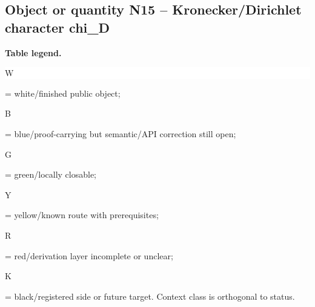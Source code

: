 \subsection*{Object or quantity N15 -- Kronecker/\allowbreak{}Dirichlet character chi\_D}
\hypertarget{objproof:N15}{}
\par\smallskip\noindent\begin{minipage}{0.99\linewidth}\footnotesize\raggedright\textbf{Table legend.} \colorbox{white}{\strut W} = white/finished public object; \colorbox{cyan!20}{\strut B} = blue/proof-carrying but semantic/API correction still open; \colorbox{green!18}{\strut G} = green/locally closable; \colorbox{yellow!25}{\strut Y} = yellow/known route with prerequisites; \colorbox{red!20}{\strut R} = red/derivation layer incomplete or unclear; \colorbox{black!18}{\strut K} = black/registered side or future target. Context class is orthogonal to status.\end{minipage}\par\vspace{0.25em}
